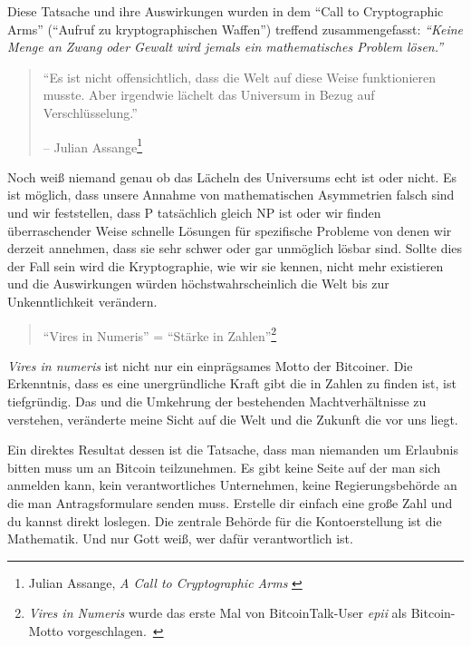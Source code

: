 Diese Tatsache und ihre Auswirkungen wurden in dem \enquote{Call to
Cryptographic Arms} (\enquote{Aufruf zu kryptographischen Waffen}) treffend
zusammengefasst: \textit{\enquote{Keine Menge an Zwang oder Gewalt wird jemals ein
mathematisches Problem lösen.}}

\begin{quotation}\begin{samepage}
\enquote{Es ist nicht offensichtlich, dass die Welt auf diese Weise
funktionieren musste. Aber irgendwie lächelt das Universum in Bezug auf
Verschlüsselung.}
\begin{flushright} -- Julian Assange\footnote{Julian Assange, \textit{A Call to Cryptographic Arms} \cite{call-to-cryptographic-arms}}
\end{flushright}\end{samepage}\end{quotation}

Noch weiß niemand genau ob das Lächeln des Universums echt ist oder nicht. Es
ist möglich, dass unsere Annahme von mathematischen Asymmetrien falsch sind und
wir feststellen, dass P tatsächlich gleich NP \cite{wiki:pnp} ist oder wir
finden überraschender Weise schnelle Lösungen für spezifische Probleme
\cite{wiki:discrete-log} von denen wir derzeit annehmen, dass sie sehr schwer
oder gar unmöglich lösbar sind. Sollte dies der Fall sein wird die
Kryptographie, wie wir sie kennen, nicht mehr existieren und die Auswirkungen
würden höchstwahrscheinlich die Welt bis zur Unkenntlichkeit verändern.

\begin{quotation}\begin{samepage}
\enquote{Vires in Numeris} = \enquote{Stärke in Zahlen}\footnote{\textit{Vires
in Numeris} wurde das erste Mal von BitcoinTalk-User \textit{epii} als
Bitcoin-Motto vorgeschlagen.~\cite{epii}}
\end{samepage}\end{quotation}

\textit{Vires in numeris} ist nicht nur ein einprägsames Motto der Bitcoiner.
Die Erkenntnis, dass es eine unergründliche Kraft gibt die in Zahlen zu finden
ist, ist tiefgründig. Das und die Umkehrung der bestehenden Machtverhältnisse zu
verstehen, veränderte meine Sicht auf die Welt und die Zukunft die vor uns
liegt.

Ein direktes Resultat dessen ist die Tatsache, dass man niemanden um Erlaubnis
bitten muss um an Bitcoin teilzunehmen. Es gibt keine Seite auf der man sich
anmelden kann, kein verantwortliches Unternehmen, keine Regierungsbehörde an die
man Antragsformulare senden muss. Erstelle dir einfach eine große Zahl und du
kannst direkt loslegen. Die zentrale Behörde für die Kontoerstellung ist die
Mathematik. Und nur Gott weiß, wer dafür verantwortlich ist.

